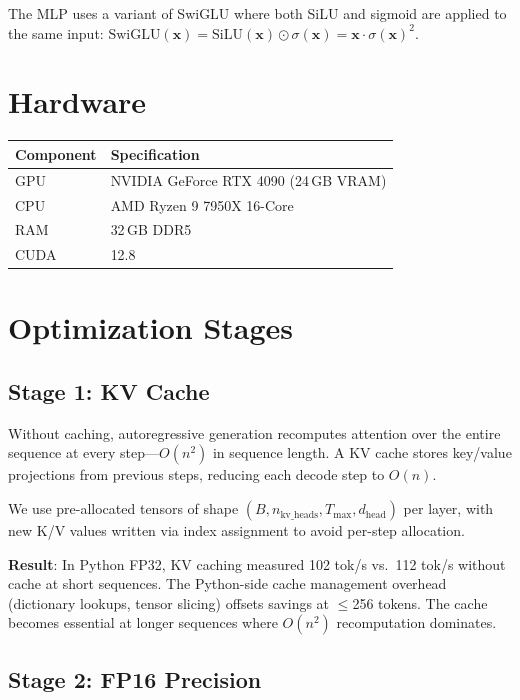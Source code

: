 \documentclass[11pt,a4paper]{article}
\begin{document}
The MLP uses a variant of SwiGLU where both SiLU and sigmoid are applied to
the same input:
$\text{SwiGLU}(\mathbf{x}) = \text{SiLU}(\mathbf{x}) \odot \sigma(\mathbf{x})
= \mathbf{x} \cdot \sigma(\mathbf{x})^2$.

\section{Hardware}

\begin{table}[H]
\centering
\begin{tabular}{ll}
\toprule
\textbf{Component} & \textbf{Specification} \\
\midrule
GPU & NVIDIA GeForce RTX 4090 (24\,GB VRAM) \\
CPU & AMD Ryzen 9 7950X 16-Core \\
RAM & 32\,GB DDR5 \\
CUDA & 12.8 \\
\bottomrule
\end{tabular}
\end{table}

\section{Optimization Stages}

\subsection{Stage 1: KV Cache}

Without caching, autoregressive generation recomputes attention over the
entire sequence at every step---$O(n^2)$ in sequence length. A KV cache
stores key/value projections from previous steps, reducing each decode step
to $O(n)$.

We use pre-allocated tensors of shape
$(B, n_\text{kv\_heads}, T_\text{max}, d_\text{head})$ per layer, with new
K/V values written via index assignment to avoid per-step allocation.

\textbf{Result}: In Python FP32, KV caching measured 102 tok/s vs.\ 112
tok/s without cache at short sequences. The Python-side cache management
overhead (dictionary lookups, tensor slicing) offsets savings at
$\leq$256 tokens. The cache becomes essential at longer sequences where
$O(n^2)$ recomputation dominates.

\subsection{Stage 2: FP16 Precision}
\end{document}
